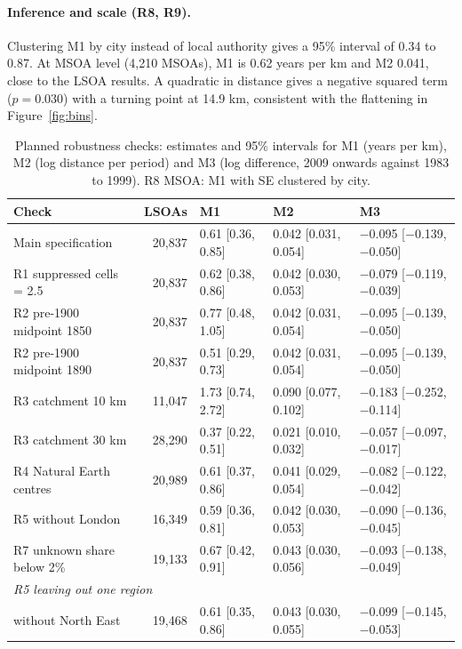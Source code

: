 \documentclass[11pt,a4paper]{article}
\begin{document}
\paragraph{Inference and scale (R8, R9).} Clustering M1 by city instead of local authority gives a 95\% interval of 0.34 to 0.87. At MSOA level (4,210 MSOAs), M1 is 0.62 years per km and M2 0.041, close to the LSOA results. A quadratic in distance gives a negative squared term ($p=0.030$) with a turning point at 14.9 km, consistent with the flattening in Figure~\ref{fig:bins}.

\begin{table}[tbp]\centering\footnotesize\setlength{\tabcolsep}{4pt}\caption{Planned robustness checks: estimates and 95\% intervals for M1 (years per km), M2 (log distance per period) and M3 (log difference, 2009 onwards against 1983 to 1999). R8 MSOA: M1 with SE clustered by city.}\label{tab:robust}\begin{tabular}{lrlll}\toprule Check & LSOAs & M1 & M2 & M3\\\midrule
Main specification & 20,837 & 0.61 [0.36, 0.85] & 0.042 [0.031, 0.054] & $-$0.095 [$-$0.139, $-$0.050]\\
R1 suppressed cells = 2.5 & 20,837 & 0.62 [0.38, 0.86] & 0.042 [0.030, 0.053] & $-$0.079 [$-$0.119, $-$0.039]\\
R2 pre-1900 midpoint 1850 & 20,837 & 0.77 [0.48, 1.05] & 0.042 [0.031, 0.054] & $-$0.095 [$-$0.139, $-$0.050]\\
R2 pre-1900 midpoint 1890 & 20,837 & 0.51 [0.29, 0.73] & 0.042 [0.031, 0.054] & $-$0.095 [$-$0.139, $-$0.050]\\
R3 catchment 10 km & 11,047 & 1.73 [0.74, 2.72] & 0.090 [0.077, 0.102] & $-$0.183 [$-$0.252, $-$0.114]\\
R3 catchment 30 km & 28,290 & 0.37 [0.22, 0.51] & 0.021 [0.010, 0.032] & $-$0.057 [$-$0.097, $-$0.017]\\
R4 Natural Earth centres & 20,989 & 0.61 [0.37, 0.86] & 0.041 [0.029, 0.054] & $-$0.082 [$-$0.122, $-$0.042]\\
R5 without London & 16,349 & 0.59 [0.36, 0.81] & 0.042 [0.030, 0.053] & $-$0.090 [$-$0.136, $-$0.045]\\
R7 unknown share below 2\% & 19,133 & 0.67 [0.42, 0.91] & 0.043 [0.030, 0.056] & $-$0.093 [$-$0.138, $-$0.049]\\
\midrule\multicolumn{5}{l}{\textit{R5 leaving out one region}}\\
\quad without North East & 19,468 & 0.61 [0.35, 0.86] & 0.043 [0.030, 0.055] & $-$0.099 [$-$0.145, $-$0.053]\\

\end{tabular}
\end{table}
\end{document}
